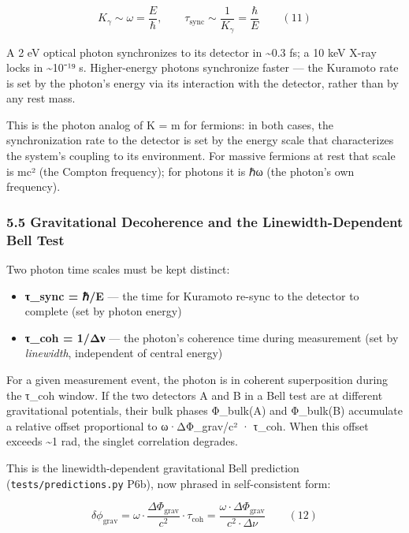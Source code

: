 \documentclass[
]{article}
\providecommand{\tightlist}{%
  \setlength{\itemsep}{0pt}\setlength{\parskip}{0pt}}
\begin{document}
\[K_\gamma \sim \omega = \frac{E}{\hbar}, \qquad \tau_{\text{sync}} \sim \frac{1}{K_\gamma} = \frac{\hbar}{E} \qquad (11)\]

A 2 eV optical photon synchronizes to its detector in \textasciitilde0.3
fs; a 10 keV X-ray locks in \textasciitilde10⁻¹⁹ s. Higher-energy
photons synchronize faster --- the Kuramoto rate is set by the photon's
energy via its interaction with the detector, rather than by any rest
mass.

This is the photon analog of K = m for fermions: in both cases, the
synchronization rate to the detector is set by the energy scale that
characterizes the system's coupling to its environment. For massive
fermions at rest that scale is mc² (the Compton frequency); for photons
it is ℏω (the photon's own frequency).

\subsubsection{5.5 Gravitational Decoherence and the Linewidth-Dependent
Bell
Test}\label{gravitational-decoherence-and-the-linewidth-dependent-bell-test}

Two photon time scales must be kept distinct:

\begin{itemize}
\tightlist
\item
  \textbf{τ\_sync = ℏ/E} --- the time for Kuramoto re-sync to the
  detector to complete (set by photon energy)
\item
  \textbf{τ\_coh = 1/Δν} --- the photon's coherence time during
  measurement (set by \emph{linewidth}, independent of central energy)
\end{itemize}

For a given measurement event, the photon is in coherent superposition
during the τ\_coh window. If the two detectors A and B in a Bell test
are at different gravitational potentials, their bulk phases Φ\_bulk(A)
and Φ\_bulk(B) accumulate a relative offset proportional to
ω·ΔΦ\_grav/c² · τ\_coh. When this offset exceeds \textasciitilde1 rad,
the singlet correlation degrades.

This is the linewidth-dependent gravitational Bell prediction
(\texttt{tests/predictions.py} P6b), now phrased in self-consistent
form:

\[\delta\phi_{\text{grav}} = \omega \cdot \frac{\Delta\Phi_{\text{grav}}}{c^2} \cdot \tau_{\text{coh}} = \frac{\omega \cdot \Delta\Phi_{\text{grav}}}{c^2 \cdot \Delta\nu} \qquad (12)\]
\end{document}
